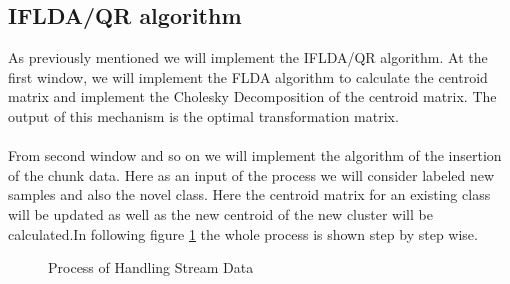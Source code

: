 \subsection{IFLDA/QR algorithm}
As previously mentioned we will implement the IFLDA/QR algorithm. At the first window, we will implement the FLDA algorithm to calculate the centroid matrix and implement the Cholesky Decomposition of the centroid matrix. The output of this mechanism is the optimal transformation matrix.\\\\
From second window and so on we will implement the algorithm of the insertion of the chunk data. Here as an input of the process we will consider labeled new samples and also the novel class. Here the centroid matrix for an existing class will be updated as well as the new centroid of the new cluster will be calculated.In following figure \ref{fig:labelOfChunkData} the whole process is shown step by step wise.
\begin{figure}[htbp]
	\centering
	
	
	\caption{Process of Handling Stream Data}
	\label{fig:labelOfChunkData}
\end{figure}
